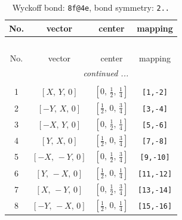 \documentclass[fleqn,8pt]{jsarticle}
\begin{document}
\begin{longtable}{cccc}
\caption{Wyckoff bond: {\tt 8f@4e}, bond symmetry: {\tt 2..}}
 \\
 \hline \hline
No. & vector & center & mapping \\ \hline \endfirsthead

\multicolumn{3}{l}{\tablename\ \thetable{}} \\
 \hline \hline
No. & vector & center & mapping \\ \hline \endhead

 \hline \hline
\multicolumn{3}{r}{\footnotesize\it continued ...} \\ \endfoot

 \hline \hline
\multicolumn{3}{r}{} \\ \endlastfoot

1 & $\left[ X,\, Y,\, 0 \right]$ & $\left[ 0,\, \frac{1}{2},\, \frac{1}{4} \right]$ & {\tt [1,-2]} \\ \hline
2 & $\left[ - Y,\, X,\, 0 \right]$ & $\left[ \frac{1}{2},\, 0,\, \frac{3}{4} \right]$ & {\tt [3,-4]} \\ \hline
3 & $\left[ - X,\, Y,\, 0 \right]$ & $\left[ 0,\, \frac{1}{2},\, \frac{1}{4} \right]$ & {\tt [5,-6]} \\ \hline
4 & $\left[ Y,\, X,\, 0 \right]$ & $\left[ \frac{1}{2},\, 0,\, \frac{3}{4} \right]$ & {\tt [7,-8]} \\ \hline
5 & $\left[ - X,\, - Y,\, 0 \right]$ & $\left[ 0,\, \frac{1}{2},\, \frac{3}{4} \right]$ & {\tt [9,-10]} \\ \hline
6 & $\left[ Y,\, - X,\, 0 \right]$ & $\left[ \frac{1}{2},\, 0,\, \frac{1}{4} \right]$ & {\tt [11,-12]} \\ \hline
7 & $\left[ X,\, - Y,\, 0 \right]$ & $\left[ 0,\, \frac{1}{2},\, \frac{3}{4} \right]$ & {\tt [13,-14]} \\ \hline
8 & $\left[ - Y,\, - X,\, 0 \right]$ & $\left[ \frac{1}{2},\, 0,\, \frac{1}{4} \right]$ & {\tt [15,-16]} \\
\end{longtable}
\renewcommand{\arraystretch}{1.2}
\end{document}
